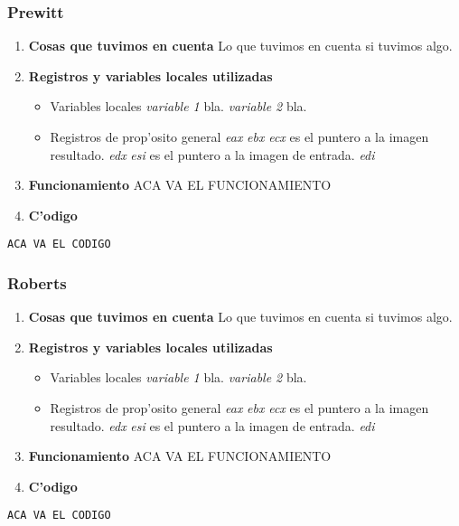\documentclass[11pt,a4paper,spanish]{article}
\begin{document}
\subsubsection{Prewitt} 
\begin{enumerate}
\item \textbf{Cosas que tuvimos en cuenta}
\subitem Lo que tuvimos en cuenta si tuvimos algo.
\item \textbf{Registros y variables locales utilizadas}
\begin{itemize}
\item Variables locales
\subitem \textit{variable 1} bla.
\subitem \textit{variable 2} bla.
\item Registros de prop'osito general 
\subitem \textit{eax}
\subitem \textit{ebx}
\subitem \textit{ecx} es el puntero a la imagen resultado.
\subitem \textit{edx} 
\subitem \textit{esi} es el puntero a la imagen de entrada.
\subitem \textit{edi} 
\end{itemize}
\item \textbf{Funcionamiento} 
\subitem ACA VA EL FUNCIONAMIENTO
\item \textbf{C'odigo}
\end{enumerate}
\begin{lstlisting}[frame=single]
ACA VA EL CODIGO
\end{lstlisting}

\subsubsection{Roberts} 
\begin{enumerate}
\item \textbf{Cosas que tuvimos en cuenta}
\subitem Lo que tuvimos en cuenta si tuvimos algo.
\item \textbf{Registros y variables locales utilizadas}
\begin{itemize}
\item Variables locales
\subitem \textit{variable 1} bla.
\subitem \textit{variable 2} bla.
\item Registros de prop'osito general 
\subitem \textit{eax}
\subitem \textit{ebx}
\subitem \textit{ecx} es el puntero a la imagen resultado.
\subitem \textit{edx} 
\subitem \textit{esi} es el puntero a la imagen de entrada.
\subitem \textit{edi} 
\end{itemize}
\item \textbf{Funcionamiento} 
\subitem ACA VA EL FUNCIONAMIENTO
\item \textbf{C'odigo}
\end{enumerate}
\begin{lstlisting}[frame=single]
ACA VA EL CODIGO
\end{lstlisting}
\end{document}
